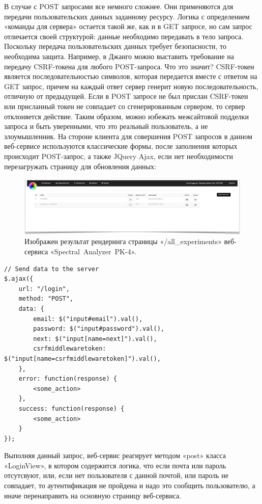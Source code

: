 В случае с POST запросами все немного сложнее. Они применяются для передачи пользовательских данных заданному ресурсу.
Логика с определением «команды для сервера» остается такой же, как и в GET запросе, но сам запрос отличается своей структурой:
данные необходимо передавать в тело запроса. Поскольку передача пользовательских данных требует безопасности, то
необходима защита. Например, в Джанго можно выставить требование на передачу CSRF-токена для любого POST-запроса.
Что это значит? CSRF-токен является последовательностью символов, которая передается вместе с ответом на GET запрос,
причем на каждый ответ сервер генерит новую последовательность, отличную от предыдущей. Если в POST запросе не был прислан
CSRF-токен или присланный токен не совпадает со сгенерированным сервером, то сервер отклоняется действие. Таким образом, можно
избежать межсайтовой подделки запроса и быть уверенными, что это реальный пользователь, а не злоумышленник.
На стороне клиента для совершения POST запросов в данном веб-сервисе используются
классические формы, после заполнения которых происходит POST-запрос, а также JQuery Ajax, если нет необходимости
перезагружать страницу для обновления данных:
\begin{figure}[t]
  \centering
  \includegraphics[width=16cm]{figures/all_experiments}
  \caption{Изображен результат рендеринга страницы «/all\_experiments» веб-сервиса «Spectral~Analyzer~PK-4».}
  \label{fig:all_experiments}
\end{figure}
\begin{lstlisting}[style=htmlcssjs]
// Send data to the server
$.ajax({
    url: "/login",
    method: "POST",
    data: {
        email: $("input#email").val(),
        password: $("input#password").val(),
        next: $("input[name=next]").val(),
        csrfmiddlewaretoken: $("input[name=csrfmiddlewaretoken]").val(),
    },
    error: function(response) {
        <some_action>
    },
    success: function(response) {
        <some_action>
    }
});
\end{lstlisting}
Выполняя данный запрос, веб-сервис реагирует методом «post» класса «LoginView», в котором содержится логика, что
если почта или пароль отсутсвуют, или, если нет пользователя с данной почтой, или пароль не совпадает, то аутентификация не пройдена
и надо это сообщить пользователю, а иначе перенаправить на основную страницу веб-сервиса.

